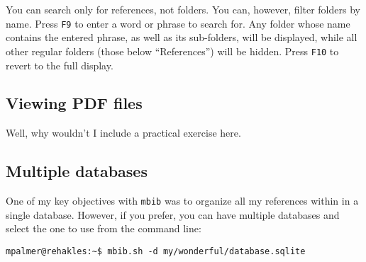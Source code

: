 \documentclass[10pt]{article}
\newcommand*{\mbib}{\texttt{mbib}\xspace}
\newcommand*{\key}[1]{\texttt{#1}\xspace}
\begin{document}
\noindent You can search only for references, not folders. You can, however, filter folders by name. Press \key{F9} to enter a word or phrase to search for. Any folder whose name contains the entered phrase, as well as its sub-folders, will be displayed, while all other regular folders (those below ``References'') will be hidden. Press \key{F10} to revert to the full display. 

\subsection{Viewing PDF files}

Well, why wouldn't I include a practical exercise here. 

\subsection{Multiple databases}

One of my key objectives with \mbib was to organize all my references within in a single database. However, if you prefer, you can have multiple databases and select the one to use from the command line: 

\begin{verbatim}
mpalmer@rehakles:~$ mbib.sh -d my/wonderful/database.sqlite
\end{verbatim}

\begin{comment}
\section{Running \mbib}

The program runs inside a console window. Assuming you have put a start-up script into your shell's path, just open a shell window (e.g.\ \texttt{konsole} on KDE, or \texttt{xterm} on any X-based desktop) and run \texttt{mbib.sh}.

%
%




\subsection{The user interface}

\begin{itemize}
\item navigation (mouse, keyboard)
\item viewing and editing references
\item importing references
\item moving things around (using selections)
\item searching and filtering
\item using the clipboard (requires xclip)
\item 
\end{itemize}

\end{comment}
\end{document}
